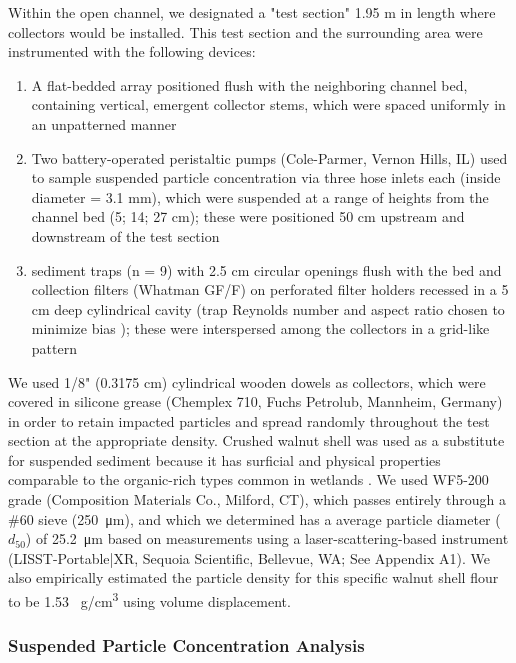 \documentclass[geosciences,article,submit,moreauthors,pdftex]{Definitions/mdpi}
\begin{document}
Within the open channel, we designated a "test section" 1.95 m in length where collectors would be installed. This test section and the surrounding area were instrumented with the following devices:
\begin{enumerate}
     \item A flat-bedded array positioned flush with the neighboring channel bed, containing vertical, emergent collector stems, which were spaced uniformly in an unpatterned manner
    \item Two battery-operated peristaltic pumps (Cole-Parmer, Vernon Hills, IL) used to sample suspended particle concentration via three hose inlets each (inside diameter = 3.1 mm), which were suspended at a range of heights from the channel bed (5; 14; 27 cm); these were positioned 50 cm upstream and downstream of the test section 
   \item sediment traps (n = 9) with 2.5 cm circular openings flush with the bed and collection filters (Whatman GF/F) on perforated filter holders recessed in a 5 cm deep cylindrical cavity (trap Reynolds number and aspect ratio chosen to minimize bias \cite{butman1986sediment}); these were interspersed among the collectors in a grid-like pattern
\end{enumerate}

We used 1/8" (0.3175 cm) cylindrical wooden dowels as collectors, which were covered in silicone grease (Chemplex 710, Fuchs Petrolub, Mannheim, Germany) in order to retain impacted particles and spread randomly throughout the test section at the appropriate density. Crushed walnut shell was used as a substitute for suspended sediment because it has surficial and physical properties comparable to the organic-rich types common in wetlands \cite{muller2017experiments, jenzer2015sediment, redding2006particle}. We used WF5-200 grade (Composition Materials Co., Milford, CT), which passes entirely through a \#60 sieve (\SI{250}{\micro\metre}), and which we determined has a average particle diameter ($d_{50}$) of \SI{25.2}{\micro\metre} based on measurements using a laser-scattering-based instrument (LISST-Portable|XR, Sequoia Scientific, Bellevue, WA; See Appendix A1). We also empirically estimated the particle density for this specific walnut shell flour to be 1.53 \SI{}{\gram/\centi\metre\cubed} using volume displacement.

\subsubsection{Suspended Particle Concentration Analysis}
\end{document}

